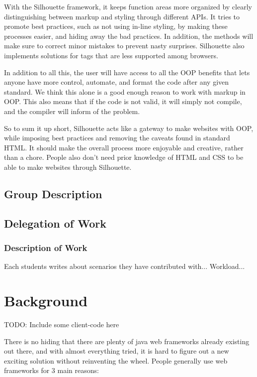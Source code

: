 \documentclass[12pt]{article}
\begin{document}
With the Silhouette framework, it keeps function areas more organized by clearly distinguishing between markup and styling through different APIs. It tries to promote best practices, such as not using in-line styling, by making these processes easier, and hiding away the bad practices. In addition, the methods will make sure to correct minor mistakes to prevent nasty surprises. Silhouette also implements solutions for tags that are less supported among browsers. 

In addition to all this, the user will have access to all the OOP benefits that lets anyone have more control, automate, and format the code after any given standard. We think this alone is a good enough reason to work with markup in OOP. This also means that if the code is not valid, it will simply not compile, and the compiler will inform of the problem.

So to sum it up short, Silhouette acts like a gateway to make websites with OOP, while imposing best practices and removing the caveats found in standard HTML. It should make the overall process more enjoyable and creative, rather than a chore. People also don't need prior knowledge of HTML and CSS to be able to make websites through Silhouette.

\subsection{Group Description}

    \subsection{Delegation of Work}

    \subsubsection{Description of Work}
    Each students writes about scenarios they have contributed with...
    Workload...

\section{Background}
TODO: Include some client-code here

There is no hiding that there are plenty of java web frameworks already existing out there, and with almost everything tried, it is hard to figure out a new exciting solution without reinventing the wheel. People generally use web frameworks for 3 main reasons:
\end{document}
